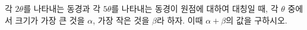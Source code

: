 각 $2\theta$를 나타내는 동경과 각 $5\theta$를 나타내는 동경이 원점에 대하여 대칭일 때, 각 $\theta$ 중에서 크기가 가장 큰 것을 $\alpha$, 가장 작은 것을 $\beta$라 하자. 이때 $\alpha+\beta$의 값을 구하시오. 
